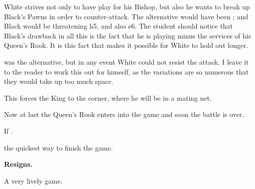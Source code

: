 \documentclass[10pt,twoside]{article}
\begin{document}
White strives not only to have play for his Bishop, but also he wants to break up Black's Pawns in order to counter-attack. The alternative would have been ; and Black would be threatening \figR h5, and also \figQ e6. The student should notice that Black's drawback in all this is the fact that he is playing minus the services of his Queen's Rook. It is this fact that makes it possible for White to hold out longer.


\board


 was the alternative, but in any event White could not resist the attack. I leave it to the reader to work this out for himself, as the variations are so numerous that they would take up too much space.


This forces the King to the corner, where he will be in a mating net.


Now at last the Queen's Rook enters into the game and soon the battle is over.


If .


the quickest way to finish the game.


\noindent\textbf{Resigns.}

A very lively game.
\end{document}
